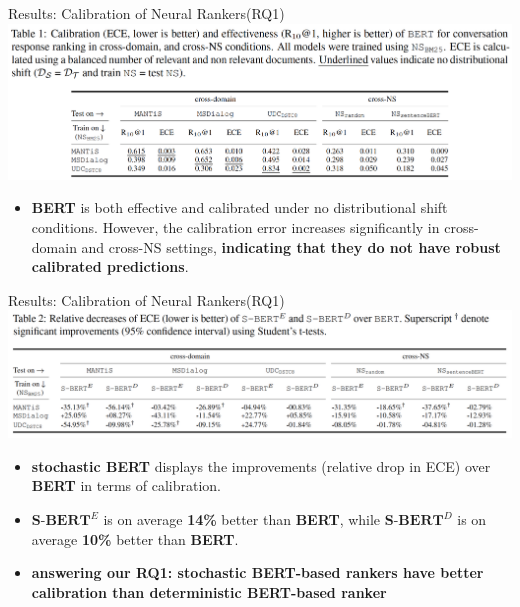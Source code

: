 \documentclass{beamer}
\begin{document}
\begin{frame}{Results: Calibration of Neural Rankers(RQ1)}
\includegraphics[scale=0.35]{table1.png}
\begin{itemize}
    \item \textbf{BERT} is both effective and calibrated under no distributional shift conditions. However, the calibration error increases significantly in cross-domain and cross-NS settings, \textbf{indicating that they do not have robust calibrated predictions}.
\end{itemize}
    
\end{frame}

\begin{frame}{Results: Calibration of Neural Rankers(RQ1)}
\includegraphics[scale=0.33]{table2.png}
\begin{itemize}
    \item \textbf{stochastic BERT} displays the improvements (relative drop in ECE) over \textbf{BERT} in terms of calibration.
    \item $\textbf{S-BERT}^{E}$ is on average \textbf{14\%} better than \textbf{BERT}, while $\textbf{S-BERT}^{D}$ is on average \textbf{10\%} better than \textbf{BERT}.
    \item \textbf{answering our RQ1: stochastic BERT-based rankers have better calibration than deterministic BERT-based ranker}
\end{itemize}
\end{frame}
\end{document}
